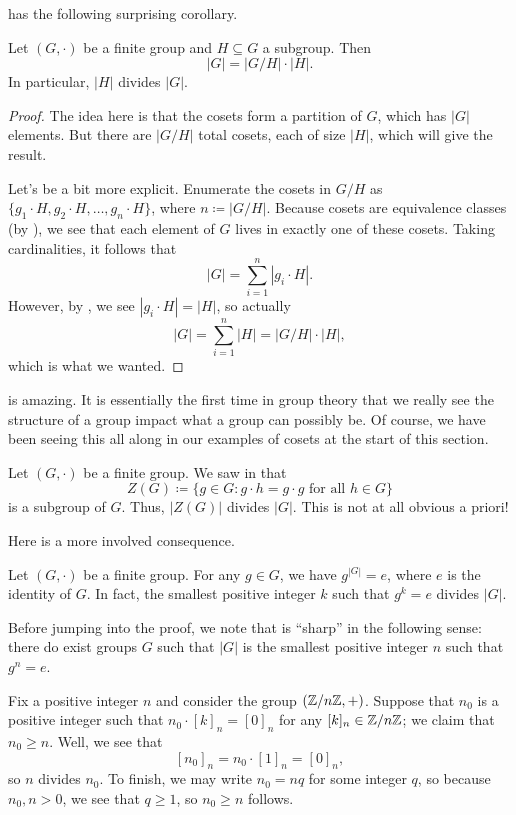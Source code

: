 \documentclass[../notes.tex]{subfiles}
\begin{document}
 has the following surprising corollary.
\begin{corollary} \label{cor:ord-subgroup}
    Let $(G,\cdot)$ be a finite group and $H\subseteq G$ a subgroup. Then
    \[|G|=|G/H|\cdot|H|.\]
    In particular, $|H|$ divides $|G|$.
\end{corollary}
\begin{proof}
    The idea here is that the cosets form a partition of $G$, which has $|G|$ elements. But there are $|G/H|$ total cosets, each of size $|H|$, which will give the result.
    
    Let's be a bit more explicit. Enumerate the cosets in $G/H$ as $\{g_1\cdot H,g_2\cdot H,\ldots,g_n\cdot H\}$, where $n\coloneqq|G/H|$. Because cosets are equivalence classes (by ), we see that each element of $G$ lives in exactly one of these cosets. Taking cardinalities, it follows that
    \[|G|=\sum_{i=1}^n|g_i\cdot H|.\]
    However, by , we see $|g_i\cdot H|=|H|$, so actually
    \[|G|=\sum_{i=1}^n|H|=|G/H|\cdot |H|,\]
    which is what we wanted.
\end{proof}
 is amazing. It is essentially the first time in group theory that we really see the structure of a group impact what a group can possibly be. Of course, we have been seeing this all along in our examples of cosets at the start of this section.
\begin{example}
    Let $(G,\cdot)$ be a finite group. We saw in  that
    \[Z(G)\coloneqq\{g\in G:g\cdot h=g\cdot g\text{ for all }h\in G\}\]
    is a subgroup of $G$. Thus, $|Z(G)|$ divides $|G|$. This is not at all obvious a priori!
\end{example}
Here is a more involved consequence.
\begin{proposition} \label{prop:ord-of-g-divides-ord-of-g}
    Let $(G,\cdot)$ be a finite group. For any $g\in G$, we have $g^{\left|G\right|}=e$, where $e$ is the identity of $G$. In fact, the smallest positive integer $k$ such that $g^k=e$ divides $\left|G\right|$.
\end{proposition}
Before jumping into the proof, we note that  is ``sharp'' in the following sense: there do exist groups $G$ such that $\left|G\right|$ is the smallest positive integer $n$ such that $g^n=e$.
\begin{example}
    Fix a positive integer $n$ and consider the group $(\mathbb Z/n\mathbb Z,+)$. Suppose that $n_0$ is a positive integer such that $n_0\cdot[k]_n=[0]_n$ for any $[k]_n\in\mathbb Z/n\mathbb Z$; we claim that $n_0\ge n$. Well, we see that
    \[[n_0]_n=n_0\cdot[1]_n=[0]_n,\]
    so $n$ divides $n_0$. To finish, we may write $n_0=nq$ for some integer $q$, so because $n_0,n>0$, we see that $q\ge1$, so $n_0\ge n$ follows.
\end{example}
\end{document}
